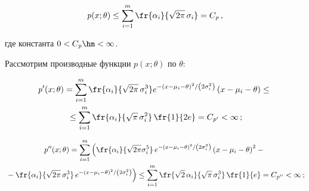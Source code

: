 \begin{equation}


\label{P_limit}


\mathit{p}(x;\theta) \le \sum\limits_{i=1}^m\fr{\alpha_i}{\sqrt{2\pi}\,\sigma_i} 


= C_{\mathit{p}}\,,


\end{equation}


где константа $0 < C_{\mathit{p}} \hm< \infty$.








Рассмотрим производные функции $\mathit{p}(x;\theta)$ по $\theta$:


\begin{multline}


\label{dp}


\mathit{p}'(x;\theta) = 


\sum\limits_{i=1}^m\fr{\alpha_i}{\sqrt{2\pi}\,\sigma_i^3}e^{{-\left(x-\mu_i-


\theta\right)^2}/\left({2\sigma_i^2}\right)}\left(x-\mu_i-\theta\right)\le {}\\


{}\le


\sum\limits_{i=1}^m\fr{\alpha_i}{\sqrt{\pi}\,\sigma_i^2}\,\fr{1}{2e} = 


C_{\mathit{p}'} < \infty\,; 


\end{multline}





\vspace*{-12pt}





\noindent


\begin{multline}


\label{ddp}


\mathit{p}''(x;\theta) = 


\sum\limits_{i=1}^m\left(\fr{\alpha_i}{\sqrt{2\pi}\sigma_i^5}\,e^{{-\left(x-


\mu_i-\theta\right)^2}/\left({2\sigma_i^2}\right)}\left(x-\mu_i-\theta\right)^2 -{} \right.\\


\left.{}-


\fr{\alpha_i}{\sqrt{2\pi}\,\sigma_i^3}\,e^{{-(x-\mu_i-


\theta)^2}/\left({2\sigma_i^2}\right)}\right) \le 


\sum\limits_{i=1}^m\fr{\sqrt{2}\,\alpha_i}{\sqrt{\pi}\,\sigma_i^3}\,\fr{1}{e} = 


C_{\mathit{p}''} < \infty\,;


\end{multline}





